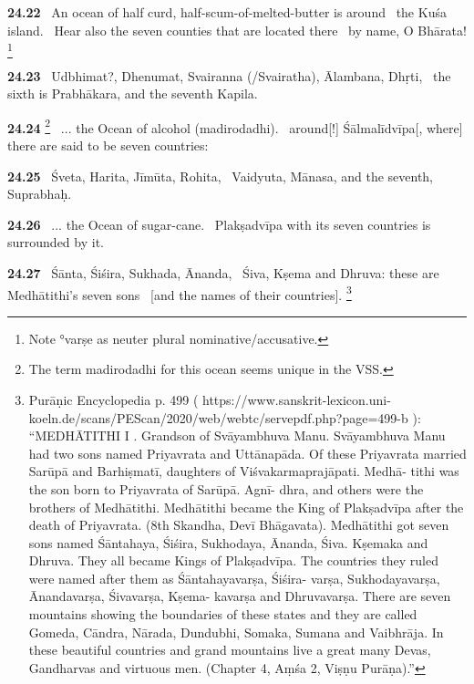 \documentclass{article}
\begin{document}
\textbf{24.22}%
\ An ocean of half curd, half-scum-of-melted-butter is around%
\                 the Kuśa island.%
\ Hear also the seven counties that are located there%
\              by name, O Bhārata!%
\footnote{Note °varṣe as neuter plural nominative/accusative. }%


\textbf{24.23}%
\ Udbhimat?, Dhenumat, Svairanna (/Svairatha), Ālambana, Dhṛti,%
\ the sixth is Prabhākara, and the seventh Kapila.%


\textbf{24.24}%
\footnote{The term madirodadhi for this ocean seems unique in the VSS. }%
\ ... the Ocean of alcohol (madirodadhi).%
\ around[!] Śālmalīdvīpa[, where] there are said to be seven countries:%


\textbf{24.25}%
\ Śveta, Harita, Jīmūta, Rohita,%
\ Vaidyuta, Mānasa, and the seventh, Suprabhaḥ.%


\textbf{24.26}%
\ ... the Ocean of sugar-cane.%
\ Plakṣadvīpa with its seven countries is surrounded by it.%


\textbf{24.27}%
\ Śānta, Śiśira, Sukhada, Ānanda,%
\ Śiva, Kṣema and Dhruva: these are Medhātithi's seven sons%
\              [and the names of their countries].%
\footnote{Purāṇic Encyclopedia p. 499        ( https://www.sanskrit-lexicon.uni-koeln.de/scans/PEScan/2020/web/webtc/servepdf.php?page=499-b ):                                ``MEDHĀTITHI I . Grandson of Svāyambhuva Manu.                                Svāyambhuva Manu had two sons named Priyavrata and                                Uttānapāda. Of these Priyavrata married Sarūpā and                                Barhiṣmatī, daughters of Viśvakarmaprajāpati. Medhā-                                tithi was the son born to Priyavrata of Sarūpā. Agnī-                                dhra, and others were the brothers of Medhātithi.                                Medhātithi became the King of Plakṣadvīpa after the                                death of Priyavrata. (8th Skandha, Devī Bhāgavata).                                Medhātithi got seven sons named Śāntahaya, Śiśira,                                Sukhodaya, Ānanda, Śiva. Kṣemaka and Dhruva. They                                all became Kings of Plakṣadvīpa. The countries they                                ruled were named after them as Śāntahayavarṣa, Śiśira-                                varṣa, Sukhodayavarṣa, Ānandavarṣa, Śivavarṣa, Kṣema-                                kavarṣa and Dhruvavarṣa. There are seven mountains                                showing the boundaries of these states and they are                                called Gomeda, Cāndra, Nārada, Dundubhi, Somaka,                                Sumana and Vaibhrāja. In these beautiful countries                                and grand mountains live a great many Devas,                                Gandharvas and virtuous men. (Chapter 4, Aṃśa 2,                                Viṣṇu Purāṇa).'' }%
\end{document}
